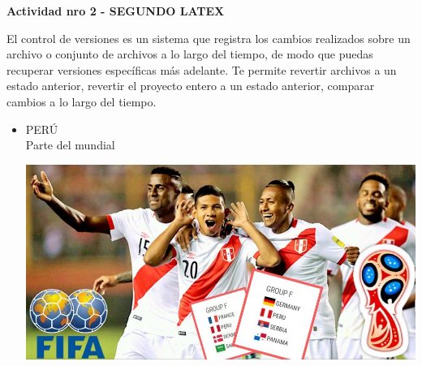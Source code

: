 
\vspace*{0.1in}
\begin{Large}
\textbf{Actividad nro 2 - SEGUNDO LATEX} \\
\end{Large}

\vspace*{0.1in}
\begin{large}
 El control de versiones es un sistema que registra los cambios realizados sobre un archivo o conjunto de archivos a lo largo del tiempo, de modo que puedas recuperar versiones específicas más adelante. Te permite revertir archivos a un estado anterior, revertir el proyecto entero a un estado anterior, comparar cambios a lo largo del tiempo.\\
\end{large}


\begin{itemize}
	\item PERÚ
	\\Parte del mundial 
	\begin{center}
	\includegraphics[width=15cm]{./Imagenes/act2_1} 
	\end{center}

\end{itemize}